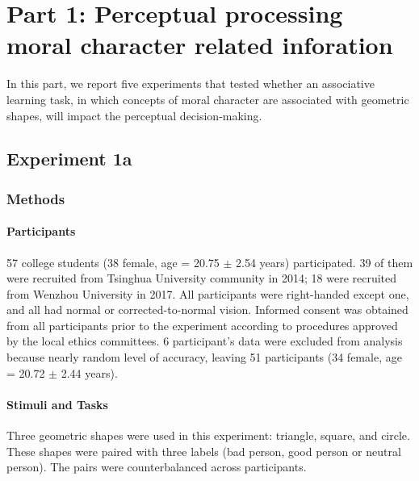 \documentclass[
  english,
  man]{apa6}
\let\oldparagraph\paragraph
\renewcommand{\paragraph}[1]{\oldparagraph{#1}\mbox{}}
\begin{document}
\hypertarget{part-1-perceptual-processing-moral-character-related-inforation}{%
\section{Part 1: Perceptual processing moral character related inforation}\label{part-1-perceptual-processing-moral-character-related-inforation}}

In this part, we report five experiments that tested whether an associative learning task, in which concepts of moral character are associated with geometric shapes, will impact the perceptual decision-making.

\hypertarget{experiment-1a}{%
\subsection{Experiment 1a}\label{experiment-1a}}

\hypertarget{methods}{%
\subsubsection{Methods}\label{methods}}

\hypertarget{participants}{%
\paragraph{Participants}\label{participants}}

57 college students (38 female, age = 20.75 \(\pm\) 2.54 years) participated. 39 of them were recruited from Tsinghua University community in 2014; 18 were recruited from Wenzhou University in 2017. All participants were right-handed except one, and all had normal or corrected-to-normal vision. Informed consent was obtained from all participants prior to the experiment according to procedures approved by the local ethics committees. 6 participant's data were excluded from analysis because nearly random level of accuracy, leaving 51 participants (34 female, age = 20.72 \(\pm\) 2.44 years).

\hypertarget{stimuli-and-tasks}{%
\paragraph{Stimuli and Tasks}\label{stimuli-and-tasks}}

Three geometric shapes were used in this experiment: triangle, square, and circle. These shapes were paired with three labels (bad person, good person or neutral person). The pairs were counterbalanced across participants.
\end{document}
